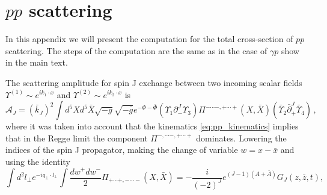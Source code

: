\documentclass[a4paper,12pt]{article}
\begin{document}
\section{$pp$ scattering}

In this appendix we will present the computation for the total cross-section of $pp$ scattering. The steps of the computation are the same as in the case of $\gamma p$ show in the main text.

The scattering amplitude for spin J exchange between two incoming scalar fields $\Upsilon^(1) \sim e^{i k_1 \cdot x}$ and $\Upsilon^(2) \sim e^{i k_2 \cdot x}$ is
\begin{equation}
\mathcal{A}_J = {\left(\bar{k}_J\right)}^2 \int d^5X d^5\bar{X} \sqrt{-g} \sqrt{-\bar{g}} e^{- \Phi -\bar{\Phi}} \left(\Upsilon_1 \partial_{-}^J \Upsilon_3\right) \Pi^{-\cdots-, + \cdots +} \left(X, \bar{X}\right) \left(\bar{\Upsilon}_2 \bar{\partial}_{+}^J \bar{\Upsilon}_4\right) \, ,
\end{equation}
where it was taken into account that the kinematics \ref{eq:pp_kinematics} implies that in the Regge limit the component $\Pi^{-,\cdots-, +\cdots+}$ dominates. Lowering the indices of the spin J propagator, making the change of variable $w = x - \bar{x}$ and using the identity
\begin{equation}
\int d^2 l_\perp e^{- i q_\perp \cdot l_\perp}\int \frac{dw^+ dw^-}{2} \Pi_{+\cdots+, - \cdots -} \left(X, \bar{X}\right) = - \frac{i}{\left(-2\right)^J} e^{\left(J-1\right)\left(A+\bar{A}\right)} G_J \left(z, \bar{z}, t\right),
\end{equation}
\end{document}
